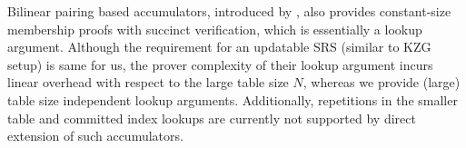 Bilinear pairing based accumulators, introduced by \cite{Nguyen05}, also provides constant-size membership proofs with succinct verification, which is essentially a lookup argument. Although the requirement for an updatable SRS (similar to KZG setup) is same for us, the prover complexity of their lookup argument \cite{CCS:TBPPTD19} incurs linear overhead with respect to the large table size $N$, whereas we provide (large) table size independent lookup arguments. Additionally, repetitions in the smaller table and committed index lookups are currently not supported by direct extension of such accumulators.



